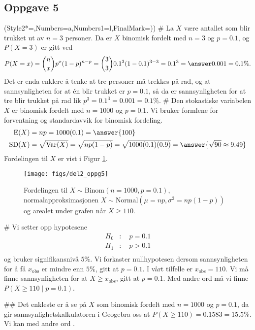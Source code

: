 \subsection*{Oppgave 5}
\begin{easylist}[enumerate]
	\ListProperties(Style2*=,Numbers=a,Numbers1=l,FinalMark={)})
	# La $X$ være antallet som blir trukket ut av $n = 3$ personer.
	Da er $X$ binomisk fordelt med $n=3$ og $p = 0.1$, og $P(X = 3)$ er gitt ved
	\begin{equation*}
		P(X = x) = \binom{n}{x} p^x (1-p)^{n-p} = 
		\binom{3}{3} 0.1^3 (1-0.1)^{3 -3} = 0.1^3 = \answer{0.001 = 0.1 \%}.
	\end{equation*}
	Det er enda enklere å tenke at tre personer må trekkes på rad, og at sannsynligheten for at én blir trukket er $p = 0.1$, så da er sannsynligheten for at tre blir trukket på rad lik $p^3 = 0.1^3 = 0.001 = 0.1 \%$.
	# Den stokastiske variabelen $X$ er binomisk fordelt med $n=1000$ og $p = 0.1$. Vi bruker formlene for forventning og standardavvik for binomisk fordeling.
	\begin{align*}
		\operatorname{E}(X) &= np = 1000 (0.1) = \answer{100}\\
		\operatorname{SD}(X) &= \sqrt{\operatorname{Var}(X)} 
		= \sqrt{np(1-p)} = \sqrt{1000 (0.1) (0.9)} = \answer{\sqrt{90} \approx 9.49}
	\end{align*}
	Fordelingen til $X$ er vist i Figur \ref{fig:del2_oppg5}.
	
\begin{figure}[ht!]
\centering
\texttt{[image: figs/del2\_oppg5]}
\caption{Fordelingen til $X \sim \text{Binom}(n =1000, p=0.1)$, normalapproksimasjonen $X \sim \text{Normal}(\mu = np, \sigma^2 = np(1-p))$
	og arealet under grafen når $X\geq 110$.}
\label{fig:del2_oppg5}
\end{figure}

	# Vi setter opp hypotesene
	\begin{align*}
		H_0 &: \quad p = 0.1\\ 
		H_1 &: \quad p > 0.1\\ 
	\end{align*}
	og bruker signifikansnivå $5 \%$. 
	Vi forkaster nullhypotesen dersom sannsynligheten for å få
	$x_\text{obs}$ er  mindre enn $5 \%$, gitt at $p = 0.1$.
	I vårt tilfelle er $x_\text{obs} = 110$.
	Vi må finne sannsynligheten for at $X \geq x_\text{obs}$,
	gitt at $p = 0.1$.
	Med andre ord må vi finne $P(X \geq 110 \mid p = 0.1)$.
	
	## Det enkleste er å se på $X$ som binomisk fordelt med
	$n = 1000$ og $p = 0.1$, da gir sannsynlighetskalkulatoren
	i Geogebra oss at $P(X \geq 110) = 0.1583 = 15.5 \%$.
	Vi kan med andre ord .
	

\end{easylist}
